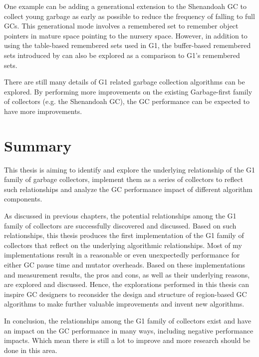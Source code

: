 One example can be adding a generational extension to the Shenandoah GC to collect
young garbage as early as possible to reduce the frequency of falling to full GCs.
This generational mode involves a remembered set to remember object pointers in mature
space pointing to the nursery space. However, in addition to using the table-based remembered
sets used in G1, the buffer-based remembered sets introduced by \cite{blackburn2008immix} can
also be explored as a comparison to G1's remembered sets.

There are still many details of G1 related garbage collection algorithms can be
explored. By performing more improvements on the existing Garbage-first family of collectors
(e.g. the Shenandoah GC), the GC performance can be expected to have more improvements.

\section{Summary}

This thesis is aiming to identify and explore the underlying relationship of the
G1 family of garbage collectors, implement them as a series of collectors to
reflect such relationships and analyze the GC performance impact of different algorithm components.

As discussed in previous chapters, the potential relationships among the G1 family of collectors
are successfully discovered and discussed.
Based on such relationships, this thesis produces the first implementation of the
G1 family of collectors that reflect on the underlying algorithmic relationships.
Most of my implementations result in a reasonable
or even unexpectedly performance for either GC pause time and mutator overheads.
Based on these implementations and measurement results, the pros and cons, as well
as their underlying reasons, are explored and discussed.
Hence, the explorations performed in this thesis can inspire GC designers to
reconsider the design and structure of region-based GC algorithms to make
further valuable improvements and invent new algorithms.

In conclusion, the relationships among the G1 family of collectors exist and have
an impact on the GC performance in many ways, including negative performance impacts.
Which mean there is still a lot to improve and more research should be done in this area.





